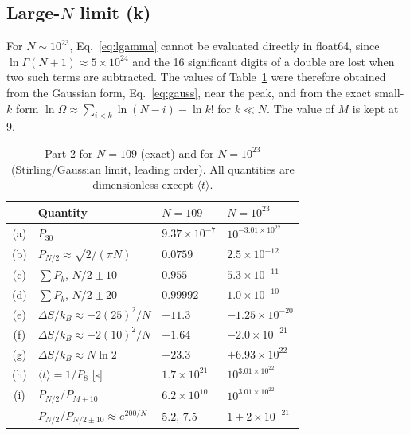 \documentclass[11pt,a4paper]{article}
\begin{document}
\subsection{Large-\texorpdfstring{$N$}{N} limit (k)}
\label{sec:2k}
For $N\sim10^{23}$, Eq.~\eqref{eq:lgamma} cannot be evaluated directly in float64, since
$\ln\Gamma(N+1)\approx5\times10^{24}$ and the 16 significant digits of a double are lost when two
such terms are subtracted. The values of Table~\ref{tab:2k} were therefore obtained from the
Gaussian form, Eq.~\eqref{eq:gauss}, near the peak, and from the exact small-$k$ form
$\ln\Omega\approx\sum_{i<k}\ln(N-i)-\ln k!$ for $k\ll N$. The value of $M$ is kept at 9.

\begin{table}[H]
  \centering
  \small
  \begin{tabular}{clll}
    \toprule
    & Quantity & $N=109$ & $N=10^{23}$ \\
    \midrule
    (a) & $P_{30}$ & $9.37\times10^{-7}$ & $10^{-3.01\times10^{22}}$ \\
    (b) & $P_{N/2}\approx\sqrt{2/(\pi N)}$ & $0.0759$ & $2.5\times10^{-12}$ \\
    (c) & $\sum P_k$, $N/2\pm10$ & $0.955$ & $5.3\times10^{-11}$ \\
    (d) & $\sum P_k$, $N/2\pm20$ & $0.99992$ & $1.0\times10^{-10}$ \\
    (e) & $\Delta S/k_B\approx-2(25)^2/N$ & $-11.3$ & $-1.25\times10^{-20}$ \\
    (f) & $\Delta S/k_B\approx-2(10)^2/N$ & $-1.64$ & $-2.0\times10^{-21}$ \\
    (g) & $\Delta S/k_B\approx N\ln2$ & $+23.3$ & $+6.93\times10^{22}$ \\
    (h) & $\langle t\rangle=1/P_8$ [\si{s}] & $1.7\times10^{21}$ & $10^{3.01\times10^{22}}$ \\
    (i) & $P_{N/2}/P_{M+10}$ & $6.2\times10^{10}$ & $10^{3.01\times10^{22}}$ \\
        & $P_{N/2}/P_{N/2\pm10}\approx e^{200/N}$ & $5.2$, $7.5$ & $1+2\times10^{-21}$ \\
    \bottomrule
  \end{tabular}
  \caption{Part 2 for $N=109$ (exact) and for $N=10^{23}$ (Stirling/Gaussian limit, leading
  order). All quantities are dimensionless except $\langle t\rangle$.}
  \label{tab:2k}
\end{table}
\end{document}
